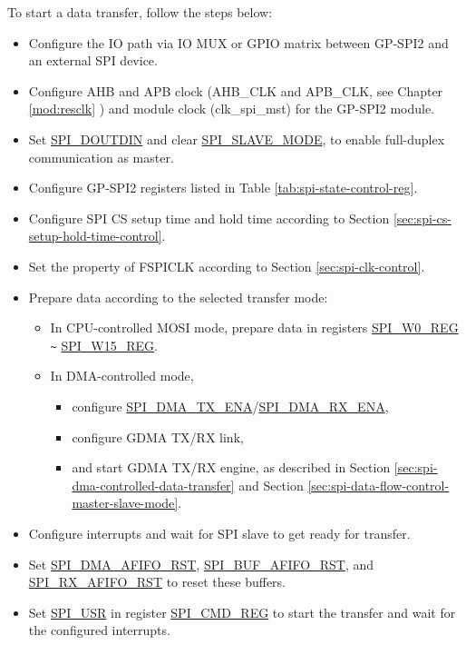 \documentclass[main\_\_EN.tex]{subfiles}
\begin{document}
To start a data transfer, follow the steps below:
\begin{itemize}
    \item Configure the IO path via IO MUX or GPIO matrix between GP-SPI2 and an external SPI device.
    \item Configure AHB and APB clock (AHB\_CLK and APB\_CLK, see Chapter \ref{mod:resclk} \textit{}) and module clock (clk\_spi\_mst) for the GP-SPI2 module.
    \item Set \hyperref[fielddesc:SPIDOUTDIN]{SPI\_DOUTDIN} and clear \hyperref[fielddesc:SPISLAVEMODE]{SPI\_SLAVE\_MODE}, to enable full-duplex communication as master.

    \item Configure GP-SPI2 registers listed in Table \ref{tab:spi-state-control-reg}.

    \item Configure SPI CS setup time and hold time according to Section \ref{sec:spi-cs-setup-hold-time-control}.

    \item Set the property of FSPICLK according to Section \ref{sec:spi-clk-control}.

    \item Prepare data according to the selected transfer mode:
    \begin{itemize}
        \item In CPU-controlled MOSI mode, prepare data in registers \hyperref[regdesc:SPIW0REG]{SPI\_W0\_REG} \verb+~+ \hyperref[regdesc:SPIW0REG]{SPI\_W15\_REG}.

        \item In DMA-controlled mode,
        \begin{itemize}
            \item configure \hyperref[fielddesc:SPIDMATXENA]{SPI\_DMA\_TX\_ENA}/\hyperref[fielddesc:SPIDMARXENA]{SPI\_DMA\_RX\_ENA},
            \item configure GDMA TX/RX link,
            \item and start GDMA TX/RX engine, as described in Section \ref{sec:spi-dma-controlled-data-transfer} and Section \ref{sec:spi-data-flow-control-master-slave-mode}.
        \end{itemize}
    \end{itemize}

    \item Configure interrupts and wait for SPI slave to get ready for transfer.

    \item Set \hyperref[fielddesc:SPIDMAAFIFORST]{SPI\_DMA\_AFIFO\_RST}, \hyperref[fielddesc:SPIBUFAFIFORST]{SPI\_BUF\_AFIFO\_RST}, and \hyperref[fielddesc:SPIRXAFIFORST]{SPI\_RX\_AFIFO\_RST} to reset these buffers.

    \item Set \hyperref[fielddesc:SPIUSR]{SPI\_USR} in register \hyperref[regdesc:SPICMDREG]{SPI\_CMD\_REG} to start the transfer and wait for the configured interrupts.

\end{itemize}
\end{document}
